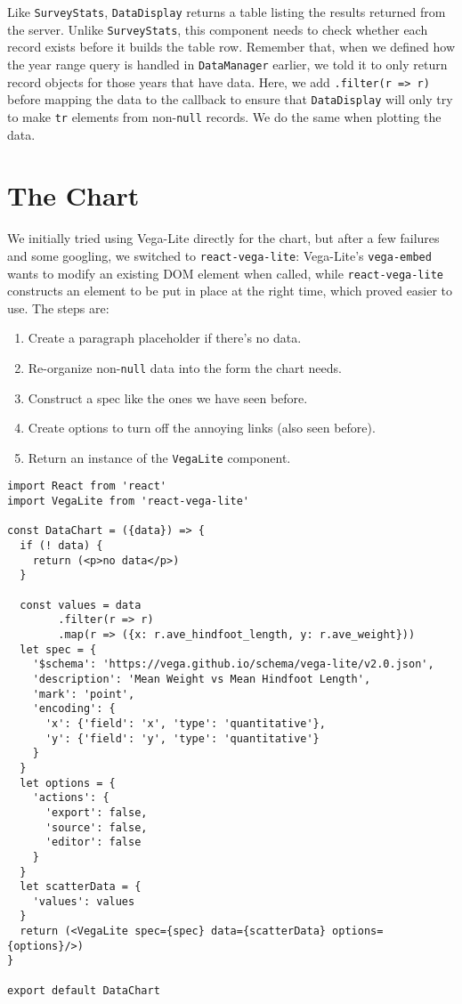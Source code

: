 Like \texttt{SurveyStats}, \texttt{DataDisplay} returns a table listing the results returned from the server.
Unlike \texttt{SurveyStats},
this component needs to check whether each record exists before it builds the table row.
Remember that,
when we defined how the year range query is handled in \texttt{DataManager} earlier,
we told it to only return record objects for those years that have data.
Here, we add \texttt{.filter(r\ =\textgreater{}\ r)} before mapping the data to the callback
to ensure that \texttt{DataDisplay} will only try to make \texttt{tr} elements from non-\texttt{null} records.
We do the same when plotting the data.

\section{The Chart}\label{s:capstone-chart}

We initially tried using Vega-Lite directly for the chart,
but after a few failures and some googling,
we switched to \texttt{react-vega-lite}:
Vega-Lite's \texttt{vega-embed} wants to modify an existing DOM element when called,
while \texttt{react-vega-lite} constructs an element to be put in place at the right time,
which proved easier to use.
The steps are:

\begin{enumerate}
\item
  Create a paragraph placeholder if there's no data.
\item
  Re-organize non-\texttt{null} data into the form the chart needs.
\item
  Construct a spec like the ones we have seen before.
\item
  Create options to turn off the annoying links (also seen before).
\item
  Return an instance of the \texttt{VegaLite} component.
\end{enumerate}

\begin{verbatim}
import React from 'react'
import VegaLite from 'react-vega-lite'

const DataChart = ({data}) => {
  if (! data) {
    return (<p>no data</p>)
  }

  const values = data
        .filter(r => r)
        .map(r => ({x: r.ave_hindfoot_length, y: r.ave_weight}))
  let spec = {
    '$schema': 'https://vega.github.io/schema/vega-lite/v2.0.json',
    'description': 'Mean Weight vs Mean Hindfoot Length',
    'mark': 'point',
    'encoding': {
      'x': {'field': 'x', 'type': 'quantitative'},
      'y': {'field': 'y', 'type': 'quantitative'}
    }
  }
  let options = {
    'actions': {
      'export': false,
      'source': false,
      'editor': false
    }
  }
  let scatterData = {
    'values': values
  }
  return (<VegaLite spec={spec} data={scatterData} options={options}/>)
}

export default DataChart
\end{verbatim}

